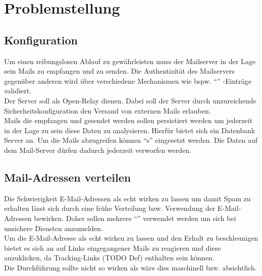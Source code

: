 \documentclass[a4paper,11pt,singlespacing]{article}
\begin{document}
\section{Problemstellung}\label{sec:Problemstellung}
	\subsection{Konfiguration}\label{sec:ProblemstellungKonfiguration}
		Um einen reibungslosen Ablauf zu gewährleisten muss der Mailserver in der Lage sein Mails zu empfangen und zu senden.
		Die Authentizität des Mailservers gegenüber anderen wird über verschiedene Mechanismen wie bspw. "`"' -Einträge validiert.
		\\
		Der Server soll als Open-Relay dienen. %
		Dabei soll der Server durch unzureichende Sicherheitskonfiguration den Versand von externen Mails erlauben.
		\\
		Mails die empfangen und gesendet werden sollen persistiert werden um jederzeit in der Lage zu sein diese Daten zu analysieren.
		Hierfür bietet sich ein Datenbank Server an. Um die Mails abzugreifen können "`s"' eingesetzt werden.
		Die Daten auf dem Mail-Server dürfen dadurch jederzeit verworfen werden.

	\subsection{Mail-Adressen verteilen}\label{sec:ProblemstellungMailsVerteilen}
		Die Schwierigkeit E-Mail-Adressen als echt wirken zu lassen um damit Spam zu erhalten lässt sich durch eine frühe Verteilung bzw. Verwendung der E-Mail-Adressen bewirken.
		Daher sollen mehrere "`"' verwendet werden um sich bei unsichere Diensten anzumelden.
		\\
		Um die E-Mail-Adresse als echt wirken zu lassen und den Erhalt zu beschleunigen bietet es sich an auf Links eingegangener Mails zu reagieren und diese anzuklicken, da Tracking-Links (TODO Def) enthalten sein können.
		\\
		Die Durchführung sollte nicht so wirken als wäre dies maschinell bzw. absichtlich.
	
\end{document}
